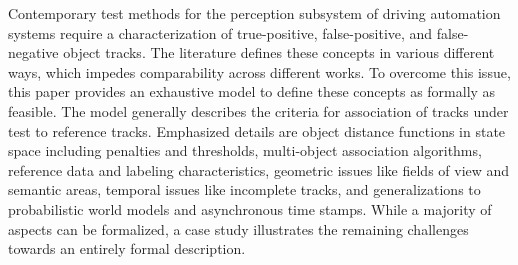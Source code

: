 Contemporary test methods for the perception subsystem of driving automation systems require a characterization of true-positive, false-positive, and false-negative object tracks. %
The literature defines these concepts in various different ways, which impedes comparability across different works. 
To overcome this issue, this paper provides an exhaustive model to define these concepts as formally as feasible.
The model generally describes the criteria for association of tracks under test to reference tracks. 
Emphasized details are object distance functions in state space including penalties and thresholds, multi-object association algorithms, reference data and labeling characteristics, geometric issues like fields of view and semantic areas, temporal issues like incomplete tracks, and generalizations to probabilistic world models and asynchronous time stamps. 
While a majority of aspects can be formalized, a case study illustrates the remaining challenges towards an entirely formal description. 



